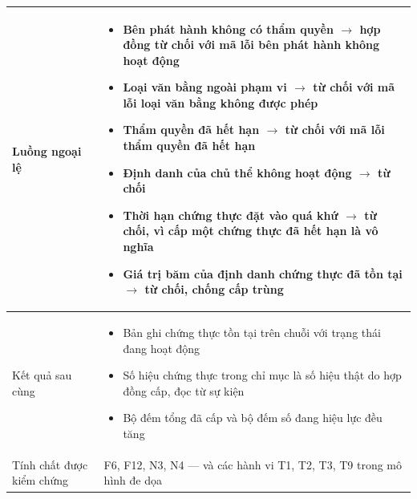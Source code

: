\begin{longtable}{|p{3.4cm}|p{10.3cm}|}
Luồng ngoại lệ &
\begin{itemize}[leftmargin=*, nosep]
    \item Bên phát hành không có thẩm quyền $\rightarrow$ hợp đồng từ chối với mã lỗi bên phát hành không hoạt động
    \item Loại văn bằng ngoài phạm vi $\rightarrow$ từ chối với mã lỗi loại văn bằng không được phép
    \item Thẩm quyền đã hết hạn $\rightarrow$ từ chối với mã lỗi thẩm quyền đã hết hạn
    \item Định danh của chủ thể không hoạt động $\rightarrow$ từ chối
    \item Thời hạn chứng thực đặt vào quá khứ $\rightarrow$ từ chối, vì cấp một chứng thực đã hết hạn là vô nghĩa
    \item Giá trị băm của định danh chứng thực đã tồn tại $\rightarrow$ từ chối, chống cấp trùng
\end{itemize} \\
\hline

Kết quả sau cùng &
\begin{itemize}[leftmargin=*, nosep]
    \item Bản ghi chứng thực tồn tại trên chuỗi với trạng thái đang hoạt động
    \item Số hiệu chứng thực trong chỉ mục là số hiệu thật do hợp đồng cấp, đọc từ sự kiện
    \item Bộ đếm tổng đã cấp và bộ đếm số đang hiệu lực đều tăng
\end{itemize} \\
\hline

Tính chất được kiểm chứng &
F6, F12, N3, N4 --- và các hành vi T1, T2, T3, T9 trong mô hình đe dọa \\
\hline

\end{longtable}
